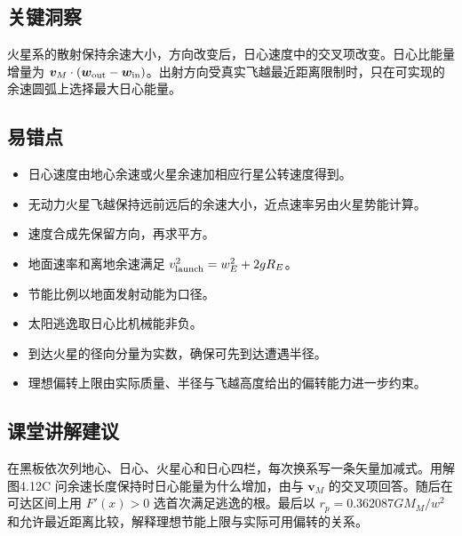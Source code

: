\documentclass[UTF8,fontset=fandol,a4paper,11pt]{ctexart}
\newcommand{\vect}[1]{\bm{#1}}
\begin{document}


\subsection*{关键洞察}

火星系的散射保持余速大小，方向改变后，日心速度中的交叉项改变。日心比能量增量为 $\vect v_M\cdot(\vect w_{\rm out}-\vect w_{\rm in})$。出射方向受真实飞越最近距离限制时，只在可实现的余速圆弧上选择最大日心能量。



\subsection*{易错点}

\begin{itemize}
\item 日心速度由地心余速或火星余速加相应行星公转速度得到。
\item 无动力火星飞越保持远前远后的余速大小，近点速率另由火星势能计算。
\item 速度合成先保留方向，再求平方。
\item 地面速率和离地余速满足 $v_{\rm launch}^2=w_E^2+2gR_E$。
\item 节能比例以地面发射动能为口径。
\item 太阳逃逸取日心比机械能非负。
\item 到达火星的径向分量为实数，确保可先到达遭遇半径。
\item 理想偏转上限由实际质量、半径与飞越高度给出的偏转能力进一步约束。
\end{itemize}



\subsection*{课堂讲解建议}

在黑板依次列地心、日心、火星心和日心四栏，每次换系写一条矢量加减式。用解图4.12C 问余速长度保持时日心能量为什么增加，由与 $\vect v_M$ 的交叉项回答。随后在可达区间上用 $F'(x)>0$ 选首次满足逃逸的根。最后以 $r_p=0.362087GM_M/w^2$ 和允许最近距离比较，解释理想节能上限与实际可用偏转的关系。

\end{document}
